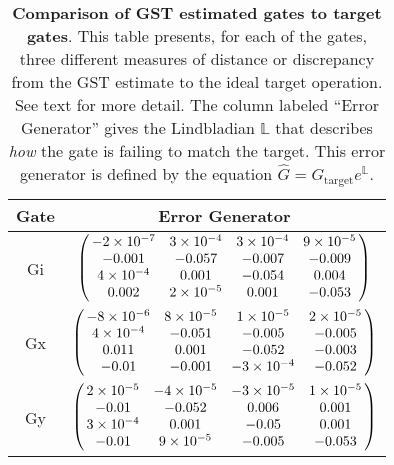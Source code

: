 {\begin{table}[h]
\begin{center}
\vspace{2em}
\begin{tabular}[l]{|c|c|}
\hline
Gate & Error Generator \\ \hline
Gi & $ \left(\!\!\begin{array}{cccc}
-2\times 10^{-7} & 3\times 10^{-4} & 3\times 10^{-4} & 9\times 10^{-5} \\ 
-0.001 & -0.057 & -0.007 & -0.009 \\ 
4\times 10^{-4} & 0.001 & -0.054 & 0.004 \\ 
0.002 & 2\times 10^{-5} & 0.001 & -0.053
 \end{array}\!\!\right) $
 \\ \hline
Gx & $ \left(\!\!\begin{array}{cccc}
-8\times 10^{-6} & 8\times 10^{-5} & 1\times 10^{-5} & 2\times 10^{-5} \\ 
4\times 10^{-4} & -0.051 & -0.005 & -0.005 \\ 
0.011 & 0.001 & -0.052 & -0.003 \\ 
-0.01 & -0.001 & -3\times 10^{-4} & -0.052
 \end{array}\!\!\right) $
 \\ \hline
Gy & $ \left(\!\!\begin{array}{cccc}
2\times 10^{-5} & -4\times 10^{-5} & -3\times 10^{-5} & 1\times 10^{-5} \\ 
-0.01 & -0.052 & 0.006 & 0.001 \\ 
3\times 10^{-4} & 0.001 & -0.05 & 0.001 \\ 
-0.01 & 9\times 10^{-5} & -0.005 & -0.053
 \end{array}\!\!\right) $
 \\ \hline
\end{tabular}

\caption{\textbf{Comparison of GST estimated gates to target gates}.  This table presents, for each of the gates, three different measures of distance or discrepancy from the GST estimate to the ideal target operation.  See text for more detail.  The column labeled ``Error Generator'' gives the Lindbladian $\mathbb{L}$ that describes \emph{how} the gate is failing to match the target.  This error generator is defined by the equation $\hat{G} = G_{\mathrm{target}}e^{\mathbb{L}}$. \label{bestCPTPGatesetVsTargetTable}}
\end{center}
\end{table}

}
